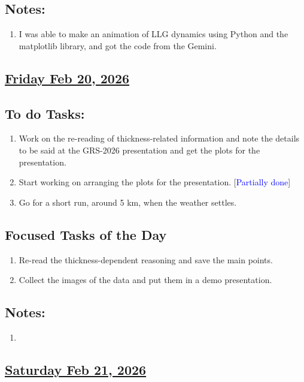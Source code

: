 \subsection*{Notes:}
\begin{enumerate}
    \item I was able to make an animation of LLG dynamics using Python and the matplotlib library, and got the code from the Gemini.
\end{enumerate}
\subsection*{\underline{Friday Feb 20, 2026}}
\subsection*{To do Tasks:}
\begin{enumerate}
    \item Work on the re-reading of thickness-related information and note the details to be said at the GRS-2026 presentation and get the plots for the presentation. \xmark
    \item Start working on arranging the plots for the presentation. [\textcolor{blue}{Partially done}]
    \item Go for a short run, around 5 km, when the weather settles. \xmark
\end{enumerate}
\subsection*{Focused Tasks of the Day}
\begin{enumerate}[\ding{52}]  %
    \item Re-read the thickness-dependent reasoning and save the main points.
    \item Collect the images of the data and put them in a demo presentation. \cmark
\end{enumerate}
\subsection*{Notes:}
\begin{enumerate}
    \item 
\end{enumerate}
\subsection*{\underline{Saturday Feb 21, 2026} }
